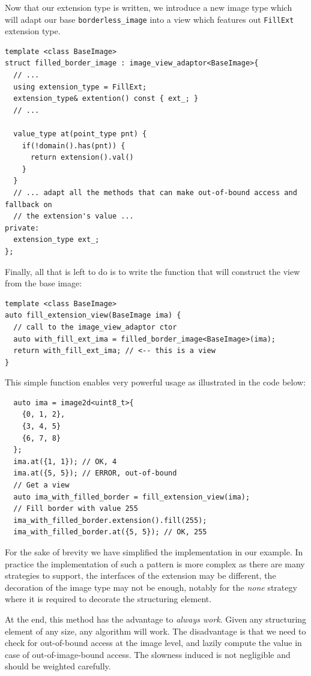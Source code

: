 Now that our extension type is written, we introduce a new image type which will adapt our base
\texttt{borderless\_image} into a view which features out \texttt{FillExt} extension type.
\begin{verbatim}
template <class BaseImage>
struct filled_border_image : image_view_adaptor<BaseImage>{
  // ...
  using extension_type = FillExt;
  extension_type& extention() const { ext_; }
  // ...

  value_type at(point_type pnt) {
    if(!domain().has(pnt)) {
      return extension().val()
    }
  }
  // ... adapt all the methods that can make out-of-bound access and fallback on
  // the extension's value ...
private:
  extension_type ext_;
};
\end{verbatim}

Finally, all that is left to do is to write the function that will construct the view from the base image:
\begin{verbatim}
template <class BaseImage>
auto fill_extension_view(BaseImage ima) {
  // call to the image_view_adaptor ctor
  auto with_fill_ext_ima = filled_border_image<BaseImage>(ima);
  return with_fill_ext_ima; // <-- this is a view
}
\end{verbatim}

This simple function enables very powerful usage as illustrated in the code below:
\begin{verbatim}
  auto ima = image2d<uint8_t>{
    {0, 1, 2},
    {3, 4, 5}
    {6, 7, 8}
  };
  ima.at({1, 1}); // OK, 4
  ima.at({5, 5}); // ERROR, out-of-bound
  // Get a view
  auto ima_with_filled_border = fill_extension_view(ima);
  // Fill border with value 255
  ima_with_filled_border.extension().fill(255);
  ima_with_filled_border.at({5, 5}); // OK, 255
\end{verbatim}

For the sake of brevity we have simplified the implementation in our example. In practice the implementation of such a
pattern is more complex as there are many strategies to support, the interfaces of the extension may be different, the
decoration of the image type may not be enough, notably for the \emph{none} strategy where it is required to decorate
the structuring element.

At the end, this method has the advantage to \textit{always work}. Given any structuring element of any size, any
algorithm will work. The disadvantage is that we need to check for out-of-bound access at the image level, and lazily
compute the value in case of out-of-image-bound access. The slowness induced is not negligible and should be weighted
carefully.

